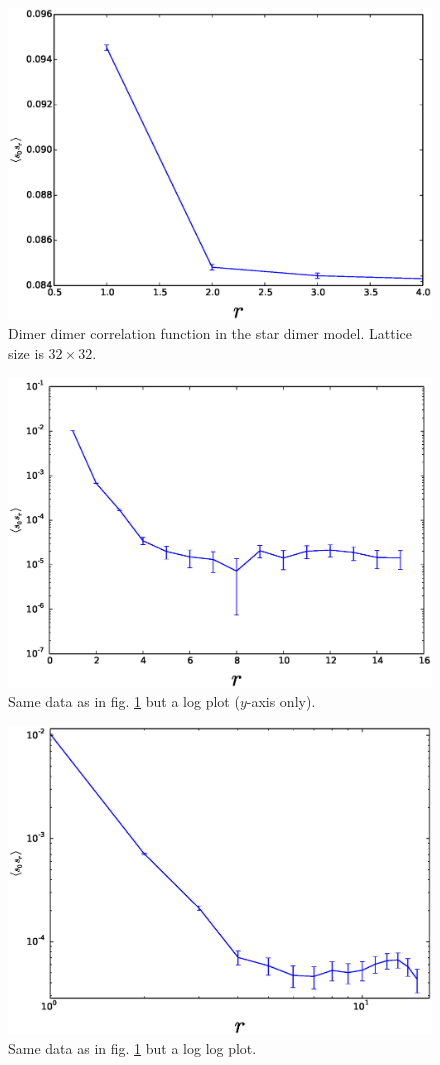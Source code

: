 \documentclass[aps,floatfix,11pt]{revtex4-1}
\begin{document}
\begin{figure}[h]
    \centering
    \includegraphics[width=8.5 cm]{s_dimer_dimer_cor}
    \caption{Dimer dimer correlation function in the star dimer model. Lattice size is $32\times
    32$. \label{fig:s_dimer_dimer}}
\end{figure}

\begin{figure}[h]
    \centering
    \includegraphics[width=8.5 cm]{s_dimer_dimer_cor_log}
    \caption{Same data as in fig. \ref{fig:s_dimer_dimer} but a log plot ($y$-axis only).
    \label{fig:s_dimer_dimer_log}}
\end{figure}

\begin{figure}[h]
    \centering
    \includegraphics[width=8.5 cm]{s_dimer_dimer_cor_loglog}
    \caption{Same data as in fig. \ref{fig:s_dimer_dimer} but a log log plot.
    \label{fig:s_dimer_dimer_loglog}}
\end{figure}
\end{document}

